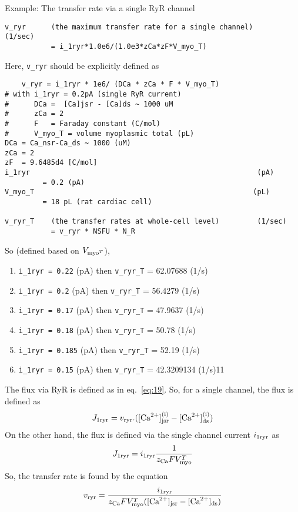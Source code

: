 Example: The transfer rate via a single RyR channel
\begin{verbatim}
v_ryr      (the maximum transfer rate for a single channel)         (1/sec)
           = i_1ryr*1.0e6/(1.0e3*zCa*zF*V_myo_T)
\end{verbatim}

Here, \verb!v_ryr! should be explicitly defined as
\begin{verbatim}
    v_ryr = i_1ryr * 1e6/ (DCa * zCa * F * V_myo_T)
# with i_1ryr = 0.2pA (single RyR current)
#      DCa =  [Ca]jsr - [Ca]ds ~ 1000 uM
#      zCa = 2
#      F   = Faraday constant (C/mol)
#      V_myo_T = volume myoplasmic total (pL)
DCa = Ca_nsr-Ca_ds ~ 1000 (uM)
zCa = 2
zF  = 9.6485d4 [C/mol]
i_1ryr                                                      (pA)
         = 0.2 (pA)
V_myo_T                                                    (pL)
         = 18 pL (rat cardiac cell)
         
v_ryr_T    (the transfer rates at whole-cell level)         (1/sec)
           = v_ryr * NSFU * N_R
\end{verbatim}
So (defined based on $V_{\text{myo}^T}$), 
\begin{enumerate}  
  \item \verb!i_1ryr = 0.22! (pA) then \verb!v_ryr_T! = 62.07688 (1/s)
  \item \verb!i_1ryr = 0.2! (pA) then \verb!v_ryr_T! = 56.4279 (1/s)
  \item \verb!i_1ryr = 0.17! (pA) then \verb!v_ryr_T! = 47.9637 (1/s)
  \item \verb!i_1ryr = 0.18! (pA) then \verb!v_ryr_T! = 50.78 (1/s)
  \item \verb!i_1ryr = 0.185! (pA) then \verb!v_ryr_T! = 52.19 (1/s)
  \item \verb!i_1ryr = 0.15! (pA) then \verb!v_ryr_T! = 42.3209134 (1/s)11
\end{enumerate}

The flux via RyR is defined as in eq.~\eqref{eq:19}. So, for a single
channel, the flux is defined as
\begin{equation}
  \label{eq:44}
      J_{1\text{ryr}} = v_{\text{ryr}}.([{\text{Ca}^{2+}}]_{\text{jsr}}^{\text{(i)}}-[{\text{Ca}^{2+}}]_{\text{ds}}^{\text{(i)}})
\end{equation}
On the other hand, the flux is defined via the single channel current
$i_{1\text{ryr}}$ as
\begin{equation}
  \label{eq:45}
  J_{1\text{ryr}} = i_{1\text{ryr}}\frac{1}{z_{\text{Ca}} F V_{\text{myo}}^T}
\end{equation}
So, the transfer rate is found by the equation
\begin{equation}
  \label{eq:46}
  v_{\text{ryr}} = \frac{i_{1\text{ryr}}}{z_{\text{Ca}} F V_{\text{myo}}^T([{\text{Ca}^{2+}}]_{\text{jsr}} - [{\text{Ca}^{2+}}]_{\text{ds}})}
\end{equation}

